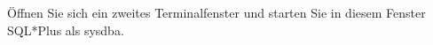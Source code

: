         \item \"Offnen Sie sich ein zweites Terminalfenster und starten Sie in diesem Fenster SQL*Plus als sysdba.
